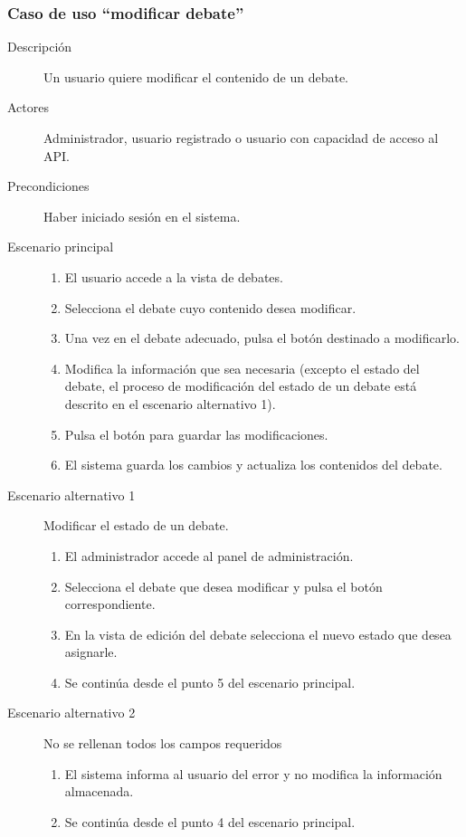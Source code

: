 \subsubsection{Caso de uso ``modificar debate''}
\begin{description}
\item[Descripción] Un usuario quiere modificar el contenido de un debate.
\item[Actores] Administrador, usuario registrado o usuario con capacidad de acceso al API.
\item[Precondiciones] Haber iniciado sesión en el sistema.
\item[Escenario principal] \hfill
						 	\begin{enumerate}
							\item El usuario accede a la vista de debates.
							\item Selecciona el debate cuyo contenido desea modificar.
							\item Una vez en el debate adecuado, pulsa el botón destinado a modificarlo.
							\item Modifica la información que sea necesaria (excepto el estado del debate, el proceso de modificación del estado de un debate está descrito en el escenario alternativo 1).
							\item Pulsa el botón para guardar las modificaciones.
							\item El sistema guarda los cambios y actualiza los contenidos del debate.
							\end{enumerate}
\item[Escenario alternativo 1]  Modificar el estado de un debate.
							\begin{enumerate}
							\item El administrador accede al panel de administración.
							\item Selecciona el debate que desea modificar y pulsa el botón correspondiente.
							\item En la vista de edición del debate selecciona el nuevo estado que desea asignarle.
							\item Se continúa desde el punto 5 del escenario principal.
							\end{enumerate}
\item[Escenario alternativo 2]  No se rellenan todos los campos requeridos
							\begin{enumerate}
							\item El sistema informa al usuario del error y no modifica la información almacenada.
							\item Se continúa desde el punto 4 del escenario principal.
							\end{enumerate}
\end{description}


